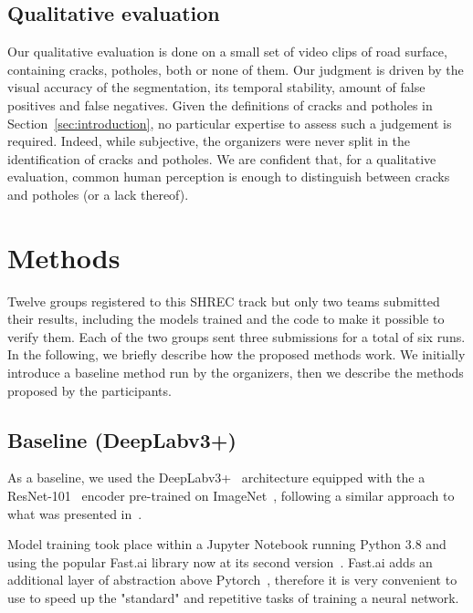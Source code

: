 \documentclass[twocolumn]{article}
\begin{document}
\subsection{Qualitative evaluation}
\label{sec:qualitative_eval}
Our qualitative evaluation is done on a small set of video clips of road surface, containing cracks, potholes, both or none of them. Our judgment is driven by the visual accuracy of the segmentation, its temporal stability, amount of false positives and false negatives. Given the definitions of cracks and potholes in Section~\ref{sec:introduction}, no particular expertise to assess such a judgement is required. Indeed, while subjective, the organizers were never split in the identification of cracks and potholes. We are confident that, for a qualitative evaluation, common human perception is enough to distinguish between cracks and potholes (or a lack thereof).


\section{Methods}
\label{sec:methods}
Twelve groups registered to this SHREC track but only two teams submitted their results, including the models trained and the code to make it possible to verify them. Each of the two groups sent three submissions for a total of six runs. In the following, we briefly describe how the proposed methods work. We initially introduce a baseline method run by the organizers, then we describe the methods proposed by the participants.



\subsection{Baseline (DeepLabv3+)}
As a baseline, we used the DeepLabv3+~\cite{chen2018encoder} architecture equipped with the a ResNet-101~\cite{resnet101} encoder pre-trained on ImageNet~\cite{deng2009imagenet}, following a similar approach to what was presented in~\cite{fan2020we}. 

Model training took place within a Jupyter Notebook running Python 3.8 and using the popular Fast.ai library now at its second version~\cite{fastai}. Fast.ai adds an additional layer of abstraction above Pytorch~\cite{paszke2019pytorch}, therefore it is very convenient to use to speed up the "standard" and repetitive tasks of training a neural network.
\end{document}
